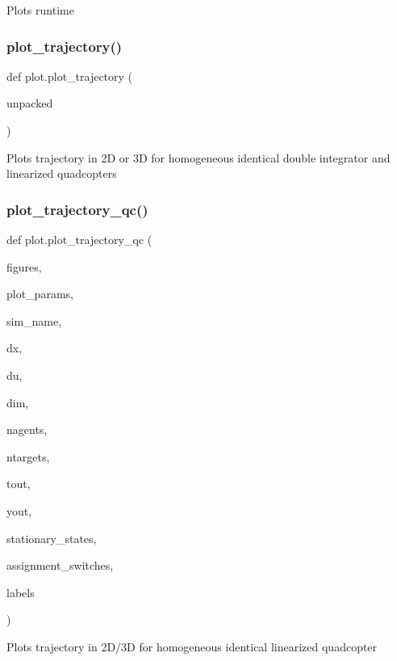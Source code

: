 \begin{DoxyVerb}Plots runtime
\end{DoxyVerb}
 \mbox{\label{namespaceplot_ac25b7a327efbae3be2f6112eb8d73f6e}} 
\subsubsection{\texorpdfstring{plot\_trajectory()}{plot\_trajectory()}}
{\footnotesize\ttfamily def plot.\+plot\+\_\+trajectory (\begin{DoxyParamCaption}\item[{}]{unpacked }\end{DoxyParamCaption})}

\begin{DoxyVerb}Plots trajectory in 2D or 3D for homogeneous identical double integrator and linearized quadcopters
\end{DoxyVerb}
 \mbox{\label{namespaceplot_aa7cee01861bd94b58f7cd046176da3f9}} 
\subsubsection{\texorpdfstring{plot\_trajectory\_qc()}{plot\_trajectory\_qc()}}
{\footnotesize\ttfamily def plot.\+plot\+\_\+trajectory\+\_\+qc (\begin{DoxyParamCaption}\item[{}]{figures,  }\item[{}]{plot\+\_\+params,  }\item[{}]{sim\+\_\+name,  }\item[{}]{dx,  }\item[{}]{du,  }\item[{}]{dim,  }\item[{}]{nagents,  }\item[{}]{ntargets,  }\item[{}]{tout,  }\item[{}]{yout,  }\item[{}]{stationary\+\_\+states,  }\item[{}]{assignment\+\_\+switches,  }\item[{}]{labels }\end{DoxyParamCaption})}

\begin{DoxyVerb}Plots trajectory in 2D/3D for homogeneous identical linearized quadcopter
\end{DoxyVerb}
 